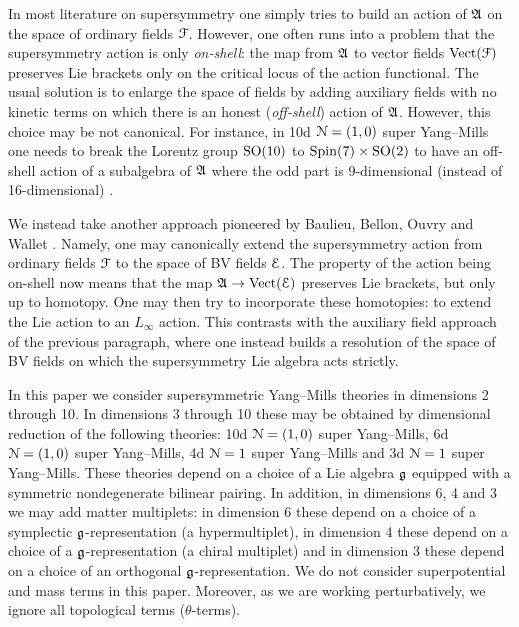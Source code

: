 \documentclass[10pt, oneside]{article}
\begin{document}
In most literature on supersymmetry one simply tries to build an action of $\mathfrak A$ on the space of ordinary fields $\mathcal F$. However, one often runs into a problem that the supersymmetry action is only \emph{on-shell}: the map from $\mathfrak A$ to vector fields $\mathrm{Vect}(\mathcal F)$ preserves Lie brackets only on the critical locus of the action functional. The usual solution is to enlarge the space of fields by adding auxiliary fields with no kinetic terms on which there is an honest (\emph{off-shell}) action of $\mathfrak A$. However, this choice may be not canonical. For instance, in 10d $\mathcal N=(1, 0)$ super Yang--Mills one needs to break the Lorentz group $\mathrm{SO}(10)$ to $\mathrm{Spin}(7)\times\mathrm{SO}(2)$ to have an off-shell action of a subalgebra of $\mathfrak A$ where the odd part is 9-dimensional (instead of 16-dimensional) \cite{BaulieuBerkovitsBossardMartin}.

We instead take another approach pioneered by Baulieu, Bellon, Ouvry and Wallet \cite{BaulieuBV}. Namely, one may canonically extend the supersymmetry action from ordinary fields $\mathcal F$ to the space of BV fields $\mathcal E$. The property of the action being on-shell now means that the map $\mathfrak A\rightarrow \mathrm{Vect}(\mathcal E)$ preserves Lie brackets, but only up to homotopy. One may then try to incorporate these homotopies: to extend the Lie action to an $L_\infty$ action.  This contrasts with the auxiliary field approach of the previous paragraph, where one instead builds a resolution of the space of BV fields on which the supersymmetry Lie algebra acts strictly.

In this paper we consider supersymmetric Yang--Mills theories in dimensions 2 through 10. In dimensions 3 through 10 these may be obtained by dimensional reduction of the following theories: 10d $\mathcal N=(1, 0)$ super Yang--Mills, 6d $\mathcal N=(1, 0)$ super Yang--Mills, 4d $\mathcal N=1$ super Yang--Mills and 3d $\mathcal N=1$ super Yang--Mills. These theories depend on a choice of a Lie algebra $\mathfrak g$ equipped with a symmetric nondegenerate bilinear pairing. In addition, in dimensions 6, 4 and 3 we may add matter multiplets: in dimension 6 these depend on a choice of a symplectic $\mathfrak g$-representation (a hypermultiplet), in dimension 4 these depend on a choice of a $\mathfrak g$-representation (a chiral multiplet) and in dimension 3 these depend on a choice of an orthogonal $\mathfrak g$-representation. We do not consider superpotential and mass terms in this paper. Moreover, as we are working perturbatively, we ignore all topological terms ($\theta$-terms).
\end{document}
